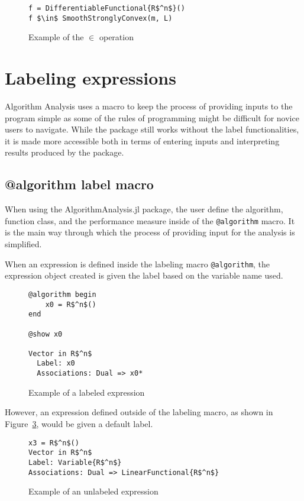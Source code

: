 \begin{figure}[h!]
	\begin{lstlisting}[mathescape]
f = DifferentiableFunctional{R$^n$}()
f $\in$ SmoothStronglyConvex(m, L)
	\end{lstlisting}
	\caption{Example of the $\in$ operation}
	\label{ex_in}
\end{figure}

\section{Labeling expressions}

Algorithm Analysis uses a macro to keep the process of providing inputs to the program simple as some of the rules of programming might be difficult for novice users to navigate. While the package still works without the label functionalities, it is made more accessible both in terms of entering inputs and interpreting results produced by the package.

\subsection*{@algorithm label macro}

When using the AlgorithmAnalysis.jl package, the user define the algorithm, function class, and the performance measure inside of the \texttt{@algorithm} macro. It is the main way through which the process of providing input for the analysis is simplified.

When an expression is defined inside the labeling macro \texttt{@algorithm}, the expression object created is given the label based on the variable name used.

\begin{figure}[h!]
	\begin{lstlisting}[mathescape]
@algorithm begin
	x0 = R$^n$()
end

@show x0

Vector in R$^n$
  Label: x0
  Associations: Dual => x0*
	\end{lstlisting}
	\caption{Example of a labeled expression}
	\label{ex_labeled}
\end{figure}

However, an expression defined outside of the labeling macro, as shown in Figure~\ref{ex_unlabeled}, would be given a default label.

\begin{figure}[h!]
	\begin{lstlisting}[mathescape]
x3 = R$^n$()
Vector in R$^n$
Label: Variable{R$^n$}
Associations: Dual => LinearFunctional{R$^n$}
\end{lstlisting}
\caption{Example of an unlabeled expression}
\label{ex_unlabeled}
\end{figure}


